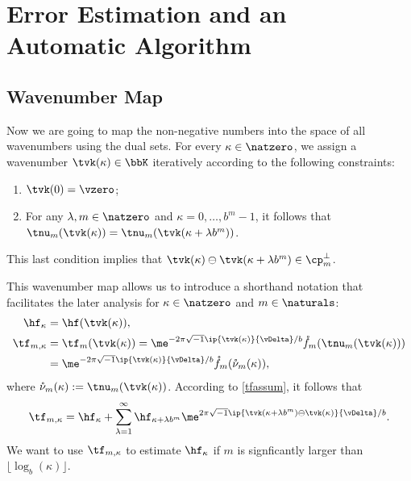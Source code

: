 \documentclass[]{elsarticle}
\theoremstyle{definition}
\newcommand{\rf}{\mathring{f}}
\newcommand{\rnu}{\mathring{\nu}}
\begin{document}
\section{Error Estimation and an Automatic Algorithm}

\subsection{Wavenumber Map}

Now we are going to map the non-negative numbers into the space of all wavenumbers using the dual sets.  For every $\kappa \in \natzero$, we assign a wavenumber $\tvk(\kappa) \in \bbK$ iteratively according to the following constraints:
\begin{enumerate}
\renewcommand{\labelenumi}{\roman{enumi})}

\item $\tvk(0)= \vzero$;

\item For any $\lambda, m \in \natzero$ and $\kappa=0, \ldots, b^m-1$, it follows that  $\tnu_m(\tvk(\kappa))=\tnu_m(\tvk(\kappa+\lambda b^m))$.

\end{enumerate}
This last condition implies that $\tvk(\kappa) \ominus \tvk(\kappa+\lambda b^m) \in \cp_m^{\perp}$.

This wavenumber map allows us to introduce a shorthand notation that facilitates the later analysis for $\kappa \in \natzero$ and $m \in \naturals$:
\begin{align*}
\hf_{\kappa} & =\hf(\tvk(\kappa)), \\
\tf_{m,\kappa}& = \tf_m(\tvk(\kappa))= \me^{-2 \pi \sqrt{-1} \ip{\tvk(\kappa)}{\vDelta}/b} \rf_m(\tnu_m(\tvk(\kappa)))\\
&= \me^{-2 \pi \sqrt{-1} \ip{\tvk(\kappa)}{\vDelta}/b} \rf_m(\rnu_m(\kappa)),
\end{align*}
where $\rnu_m(\kappa):=\tnu_m(\tvk(\kappa))$. According to \eqref{tfassum}, it follows that
\begin{equation}
\tf_{m,\kappa} = \hf_{\kappa} + \sum_{\lambda=1}^{\infty} \hf_{\kappa+\lambda b^{m}} \me^{2 \pi \sqrt{-1} \ip{\tvk(\kappa+\lambda b^{m}) \ominus \tvk(\kappa)}{\vDelta}/b}.
\label{tfassumc}
\end{equation}
We want to use $\tf_{m,\kappa}$ to estimate $\hf_{\kappa}$ if $m$ is signficantly larger than $\lfloor \log_b(\kappa) \rfloor$.
\end{document}
